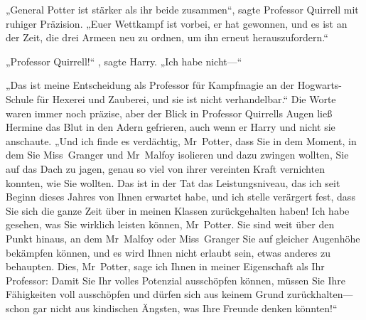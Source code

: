 „General Potter ist stärker als ihr beide zusammen“, sagte Professor Quirrell mit ruhiger Präzision. „Euer Wettkampf ist vorbei, er hat gewonnen, und es ist an der Zeit, die drei Armeen neu zu ordnen, um ihn erneut herauszufordern.“

„Professor Quirrell!“ , sagte Harry. „Ich habe nicht—“

„Das ist meine Entscheidung als Professor für Kampfmagie an der Hogwarts-Schule für Hexerei und Zauberei, und sie ist nicht verhandelbar.“ Die Worte waren immer noch präzise, aber der Blick in Professor Quirrells Augen ließ Hermine das Blut in den Adern gefrieren, auch wenn er Harry und nicht sie anschaute. „Und ich finde es verdächtig, Mr~Potter, dass Sie in dem Moment, in dem Sie Miss~Granger und Mr~Malfoy isolieren und dazu zwingen wollten, Sie auf das Dach zu jagen, genau so viel von ihrer vereinten Kraft vernichten konnten, wie Sie wollten. Das ist in der Tat das Leistungsniveau, das ich seit Beginn dieses Jahres von Ihnen erwartet habe, und ich stelle verärgert fest, dass Sie sich die ganze Zeit über in meinen Klassen zurückgehalten haben! Ich habe gesehen, was Sie wirklich leisten können, Mr~Potter. Sie sind weit über den Punkt hinaus, an dem Mr~Malfoy oder Miss~Granger Sie auf gleicher Augenhöhe bekämpfen können, und es wird Ihnen nicht erlaubt sein, etwas anderes zu behaupten. Dies, Mr~Potter, sage ich Ihnen in meiner Eigenschaft als Ihr Professor: Damit Sie Ihr volles Potenzial ausschöpfen können, müssen Sie Ihre Fähigkeiten voll ausschöpfen und dürfen sich aus keinem Grund zurückhalten—schon gar nicht aus kindischen Ängsten, was Ihre Freunde denken könnten!“

